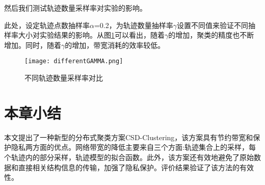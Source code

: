 然后我们测试轨迹数量采样率对实验的影响。

此处，设定轨迹点数抽样率$\alpha$=0.2，为轨迹数量抽样率$\gamma$设置不同值来验证不同抽样率大小对实验结果的影响。从图\ref{differentGAMMA}可以看出，随着$\gamma$的增加，聚类的精度也不断增加。同时，随着$\gamma$的增加，带宽消耗的效率较低。
\begin{figure}[H]
	\texttt{[image: differentGAMMA.png]}
	\caption{不同轨迹数量采样率对比}
	\label{differentGAMMA}
\end{figure}

\section{本章小结}

本文提出了一种新型的分布式聚类方案CSD-Clustering，该方案具有节约带宽和保护隐私两方面的优点。网络带宽的降低主要来自三个方面:轨迹集合上的采样，每个轨迹内的部分采样，轨迹模型的拟合函数。此外，该方案还有效地避免了原始数据和直接相关结构信息的传输，加强了隐私保护。评价结果验证了该方法的有效性。